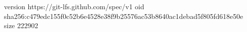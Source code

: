 version https://git-lfs.github.com/spec/v1
oid sha256:c479edc155f0c52b6e4528e38f9b25576ac53b8640ac1debad5f805fd618e50e
size 222902
